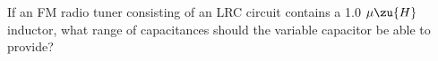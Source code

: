         If an FM radio tuner consisting of an LRC circuit
        contains a 1.0 $\mu\zu{H}$ inductor,  what range of
        capacitances should the variable capacitor be able to provide?\answercheck
